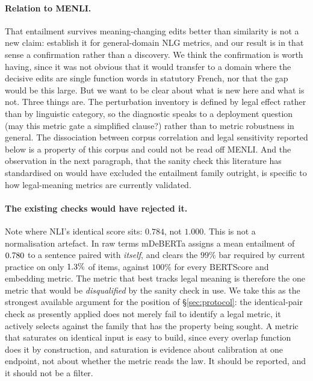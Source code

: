 \documentclass[11pt]{article}
\begin{document}
\paragraph{Relation to \textsc{MENLI}.}
That entailment survives meaning-changing edits better than similarity is not a
new claim: \citet{chen2023menli} establish it for general-domain NLG metrics,
and our result is in that sense a confirmation rather than a discovery. We think
the confirmation is worth having, since it was not obvious that it would
transfer to a domain where the decisive edits are single function words in
statutory French, nor that the gap would be this large. But we want to be clear
about what is new here and what is not. Three things are. The perturbation
inventory is defined by legal effect rather than by linguistic category, so the
diagnostic speaks to a deployment question (may this metric gate a simplified
clause?) rather than to metric robustness in general. The dissociation between
corpus correlation and legal sensitivity reported below is a property of this
corpus and could not be read off \textsc{MENLI}. And the observation in the next
paragraph, that the sanity check this literature has standardised on would have
excluded the entailment family outright, is specific to how legal-meaning
metrics are currently validated.

\paragraph{The existing checks would have rejected it.}
Note where NLI's identical score sits: $0.784$, not $1.000$. This is not a
normalisation artefact. In raw terms mDeBERTa assigns a mean entailment of
$0.780$ to a sentence paired with \emph{itself}, and clears the $99\%$
bar required by current practice \citep{beauchemin2025judgebert} on only
$1.3\%$ of items, against $100\%$ for every BERTScore and embedding
metric. The metric that best tracks legal meaning is therefore the one metric
that would be \emph{disqualified} by the sanity check in use. We take this as
the strongest available argument for the position of \S\ref{sec:protocol}: the
identical-pair check as presently applied does not merely fail to identify a
legal metric, it actively selects against the family that has the property being
sought. A metric that saturates on identical input is easy to build, since every
overlap function does it by construction, and saturation is evidence about
calibration at one endpoint, not about whether the metric reads the law. It
should be reported, and it should not be a filter.
\end{document}
